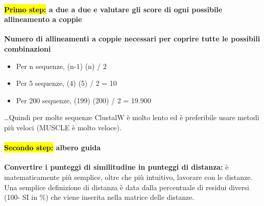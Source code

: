 \documentclass{article}
\begin{document}
\paragraph{\hl{Primo step:} a due a due e valutare gli score di ogni possibile allineamento a coppie\\}
\textbf{Numero di allineamenti a coppie necessari per coprire tutte le possibili combinazioni}
\begin{itemize}
    \item Per n sequenze, (n-1) (n) / 2
    \item Per 5 sequenze, (4) (5) / 2 = 10
    \item Per 200 sequenze, (199) (200) / 2 = 19.900
\end{itemize}…Quindi per molte sequenze ClustalW è molto lento ed è preferibile usare metodi più veloci (MUSCLE è molto veloce).
\paragraph{\hl{Secondo step:} albero guida\\}
\textbf{Convertire i punteggi di similitudine in punteggi di distanza:} è matematicamente più semplice, oltre che più intuitivo, lavorare con le distanze. Una semplice definizione di distanza è data dalla percentuale di
residui diversi (100- SI in \%) che viene inserita nella matrice delle distanze.
\end{document}
